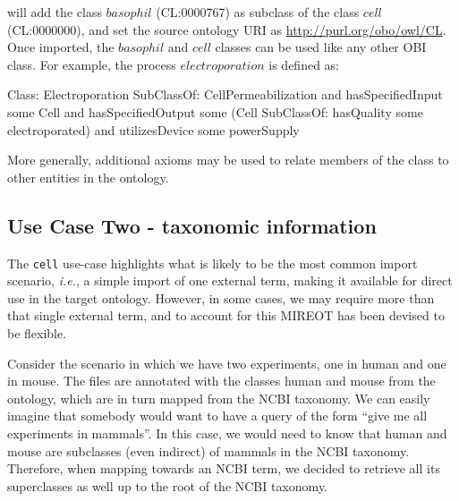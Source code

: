 \documentclass{ao2e}%
\begin{document}
will add the class $basophil$ (CL:0000767) as subclass of the class $cell$  (CL:0000000), and set the source ontology URI as \url{http://purl.org/obo/owl/CL}.
Once imported, the $basophil$ and $cell$ classes can be used like any other OBI class. For example, the process $electroporation$ is defined as:

\begin{footnotesize}
\begin{verbatimtab}
Class: Electroporation
    SubClassOf: CellPermeabilization
		        and hasSpecifiedInput some Cell
			and hasSpecifiedOutput some (Cell SubClassOf: hasQuality some electroporated)
			and utilizesDevice some powerSupply	
\end{verbatimtab}
\end{footnotesize}

More generally, additional axioms may be used to relate members of the class to other entities in the ontology.


\subsection*{Use Case Two - taxonomic information}

The \texttt{cell} use-case highlights what is likely to be the most common import scenario, \emph{i.e.}, a simple import of one external term, making it available for direct use in the target ontology.
However, in some cases, we may require more than that single external term, and to account for this \ac{MIREOT} has been devised to be flexible.

Consider the scenario in which we have two experiments, one in human and one in mouse. 
The files are annotated with the classes human and mouse from the ontology, which are in turn mapped from the NCBI taxonomy. 
We can easily imagine that somebody would want to have a query of the form ``give me all 
experiments in mammals''. In this case, we would need to know that human and mouse are 
subclasses (even indirect) of mammals in the NCBI taxonomy. Therefore, when mapping 
towards an NCBI term, we decided to retrieve all its superclasses as well up to the root of the 
NCBI taxonomy.
\end{document}
